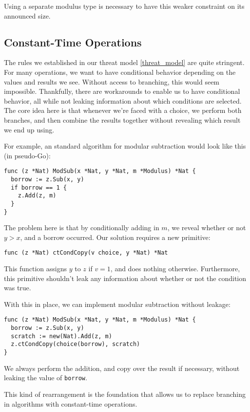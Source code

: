 \documentclass[11pt, a4paper]{article} %
\begin{document}
{Using a separate modulus type is necessary to have this
weaker constraint on its announced size.

\subsection{Constant-Time Operations}

The rules we established in our threat model \ref{threat_model}
are quite stringent. For many operations, we want to have conditional
behavior depending on the values and results we see. Without access
to branching, this would seem impossible. Thankfully, there are workarounds
to enable us to have conditional behavior, all while not leaking information
about which conditions are selected. The core idea here is that whenever
we're faced with a choice, we perform both branches, and then combine
the results together without revealing which result we end up using.

For example, an standard algorithm for modular subtraction would look
like this (in pseudo-Go):

\begin{verbatim}
func (z *Nat) ModSub(x *Nat, y *Nat, m *Modulus) *Nat {
  borrow := z.Sub(x, y)
  if borrow == 1 {
    z.Add(z, m)
  }
}
\end{verbatim}

The problem here is that by conditionally adding in $m$, we reveal
whether or not $y > x$, and a borrow occurred. Our solution
requires a new primitive:

\begin{verbatim}
func (z *Nat) ctCondCopy(v choice, y *Nat) *Nat
\end{verbatim}

This function assigns $y$ to $z$ if $v = 1$, and does nothing otherwise.
Furthermore, this primitive shouldn't leak any information about
whether or not the condition was true.

With this in place, we can implement modular subtraction without leakage:

\begin{verbatim}
func (z *Nat) ModSub(x *Nat, y *Nat, m *Modulus) *Nat {
  borrow := z.Sub(x, y)
  scratch := new(Nat).Add(z, m)
  z.ctCondCopy(choice(borrow), scratch)
}
\end{verbatim}

We always perform the addition, and copy over the result if necessary,
without leaking the value of \texttt{borrow}.

This kind of rearrangement is the foundation that allows us to replace
branching in algorithms with constant-time operations.

}
\end{document}
